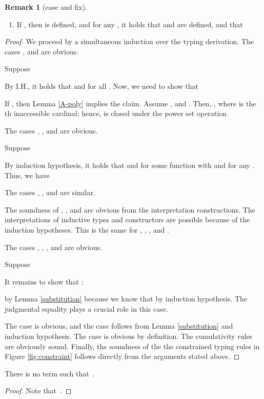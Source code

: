 \documentclass{LMCS}
\theoremstyle{plain}
\theoremstyle{definition}
\newtheorem{remm}[thm]{Remark}
\begin{document}
\begin{remm}[\textsf{case} and \textsf{fix}]
\begin{thm}[Soundness]
\begin{enumerate}[\em(1)]
\item If , then  is defined, and for any , it holds that  and  are defined, and that

\end{enumerate}
\end{thm}
\begin{proof}
  We proceed by a simultaneous induction over the typing derivation. The cases , and  are obvious.\medskip

\noindent  Suppose

By I.H., it holds that  and  for all . Now, we need to show that 

If , then Lemma \ref{A-poly} implies the claim. Assume , and . Then, , where  is the th inaccessible cardinal; hence,  is closed under the power set operation.\medskip

\noindent The cases , , and  are obvious.\medskip


\noindent  Suppose 

By induction hypothesis, it holds that  and  for some function  with  and  for any . Thus, we have

The cases , , and  are similar.\medskip

The soundness of , , and  are obvious from the interpretation constructions. The interpretations of inductive types and constructors are possible because of the induction hypotheses. This is the same for , , , and .\medskip

\noindent The cases , , , and  are obvious.\medskip

\noindent  Suppose

It remains to show that :

by Lemma \ref{substitution} because we know that  by induction hypothesis. The judgmental equality plays a crucial role in this case.\medskip

The case  is obvious, and the case  follows from Lemma \ref{substitution} and induction hypothesis. The case  is obvious by definition. The cumulativity rules are obviously sound. Finally, the soundness of the the constrained typing rules in Figure \ref{fig:constraint} follows directly from the arguments stated above. 
\end{proof}

\begin{thm}[Consistency]
  There is no term  such that \,.
\end{thm}
\begin{proof}
 Note that  \,.
\end{proof}


\end{remm}
\end{document}
